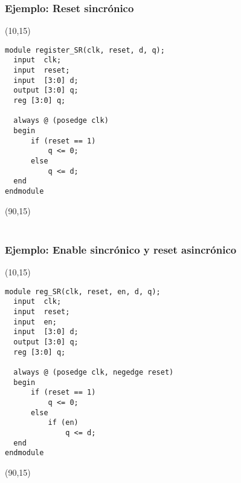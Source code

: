 \documentclass[aspectratio=169]{beamer}
\begin{document}
\begin{frame}[fragile,t]
    \frametitle{Ejemplo: Reset sincrónico}
    \begin{textblock}{75}(10,15)
\begin{lstlisting}
module register_SR(clk, reset, d, q);
  input  clk;
  input  reset;
  input  [3:0] d;
  output [3:0] q;
  reg [3:0] q;
    
  always @ (posedge clk)
  begin
      if (reset == 1)
          q <= 0;
      else
          q <= d;
  end
endmodule
\end{lstlisting}
    \end{textblock}
    \begin{textblock}{60}(90,15)    
    \\
    \bigskip
    \\
    \bigskip
    \end{textblock}
\end{frame}

\begin{frame}[fragile,t]
    \frametitle{Ejemplo: Enable sincrónico y reset asincrónico}
    \begin{textblock}{75}(10,15)
\begin{lstlisting}
module reg_SR(clk, reset, en, d, q);
  input  clk;
  input  reset;
  input  en;
  input  [3:0] d;
  output [3:0] q;
  reg [3:0] q;
    
  always @ (posedge clk, negedge reset)
  begin
      if (reset == 1)
          q <= 0;
      else
          if (en)
              q <= d;
  end
endmodule
\end{lstlisting}
    \end{textblock}
    \begin{textblock}{63}(90,15)
    \\
    \bigskip
    \\
    \bigskip
    \end{textblock}
\end{frame}
\end{document}
